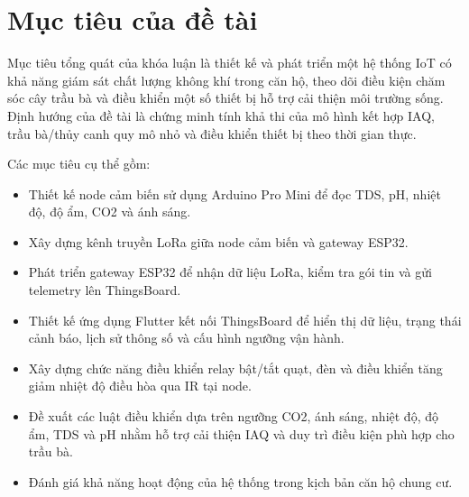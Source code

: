 \section{Mục tiêu của đề tài}
Mục tiêu tổng quát của khóa luận là thiết kế và phát triển một hệ thống IoT có khả năng giám sát chất lượng không khí trong căn hộ, theo dõi điều kiện chăm sóc cây trầu bà và điều khiển một số thiết bị hỗ trợ cải thiện môi trường sống. Định hướng của đề tài là chứng minh tính khả thi của mô hình kết hợp IAQ, trầu bà/thủy canh quy mô nhỏ và điều khiển thiết bị theo thời gian thực.

Các mục tiêu cụ thể gồm:
\begin{itemize}
    \item Thiết kế node cảm biến sử dụng Arduino Pro Mini để đọc TDS, pH, nhiệt độ, độ ẩm, CO2 và ánh sáng.
    \item Xây dựng kênh truyền LoRa giữa node cảm biến và gateway ESP32.
    \item Phát triển gateway ESP32 để nhận dữ liệu LoRa, kiểm tra gói tin và gửi telemetry lên ThingsBoard.
    \item Thiết kế ứng dụng Flutter kết nối ThingsBoard để hiển thị dữ liệu, trạng thái cảnh báo, lịch sử thông số và cấu hình ngưỡng vận hành.
    \item Xây dựng chức năng điều khiển relay bật/tắt quạt, đèn và điều khiển tăng giảm nhiệt độ điều hòa qua IR tại node.
    \item Đề xuất các luật điều khiển dựa trên ngưỡng CO2, ánh sáng, nhiệt độ, độ ẩm, TDS và pH nhằm hỗ trợ cải thiện IAQ và duy trì điều kiện phù hợp cho trầu bà.
    \item Đánh giá khả năng hoạt động của hệ thống trong kịch bản căn hộ chung cư.
\end{itemize}
